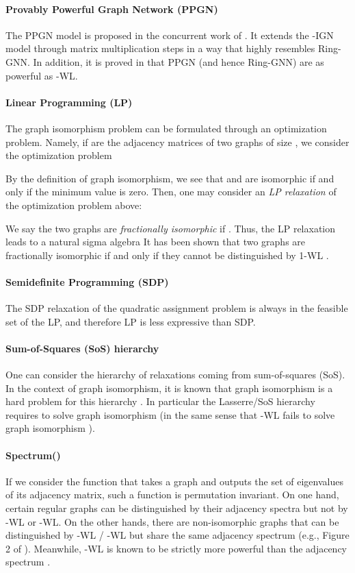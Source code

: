 \documentclass{article}
\begin{document}
\paragraph{Provably Powerful Graph Network (PPGN)} The PPGN model is proposed in the concurrent work of \cite{maron2019provably}. It extends the -IGN model through matrix multiplication steps in a way that highly resembles Ring-GNN. In addition, it is proved in \cite{maron2019provably} that PPGN (and hence Ring-GNN) are as powerful as -WL.

\paragraph{Linear Programming (LP)} The graph isomorphism problem can be formulated through an optimization problem. Namely, if  are the adjacency matrices of two graphs of size , we consider the optimization problem

By the definition of graph isomorphism, we see that  and  are isomorphic if and only if the minimum value is zero.
Then, one may consider an \emph{LP relaxation} of the optimization problem above:

We say the two graphs are \emph{fractionally isomorphic} if .
Thus, the LP relaxation leads to a natural sigma algebra  
It has been shown that two graphs are fractionally isomorphic if and only if they cannot be distinguished by 1-WL \cite{tinhofer1986graph, tinhofer1991note, ramana1994fractional}. 

\paragraph{Semidefinite Programming (SDP)} 
The SDP relaxation of the quadratic assignment problem \cite{zhao1998semidefinite} is always in the feasible set of the LP, and therefore LP is less expressive than SDP.
\paragraph{Sum-of-Squares (SoS) hierarchy} One can consider the hierarchy of relaxations coming from sum-of-squares (SoS). In the context of graph isomorphism, it is known that graph isomorphism is a hard problem for this hierarchy \cite{o2014hardness}. In particular the Lasserre/SoS hierarchy requires  to solve graph isomorphism (in the same sense that -WL fails to solve graph isomorphism \cite{cai1992optimal}).

\paragraph{Spectrum()} If we consider the function that takes a graph and outputs the set of eigenvalues of its adjacency matrix, such a function is permutation invariant. 
On one hand, certain regular graphs can be distinguished by their adjacency spectra but not by -WL or -WL. On the other hands, there are non-isomorphic graphs that can be distinguished by -WL / -WL but share the same adjacency spectrum (e.g., Figure 2 of \cite{ramana1994fractional}). Meanwhile, -WL is known to be strictly more powerful than the adjacency spectrum \cite{furer2010combinatorial, rattan2023spectra}.
\end{document}

